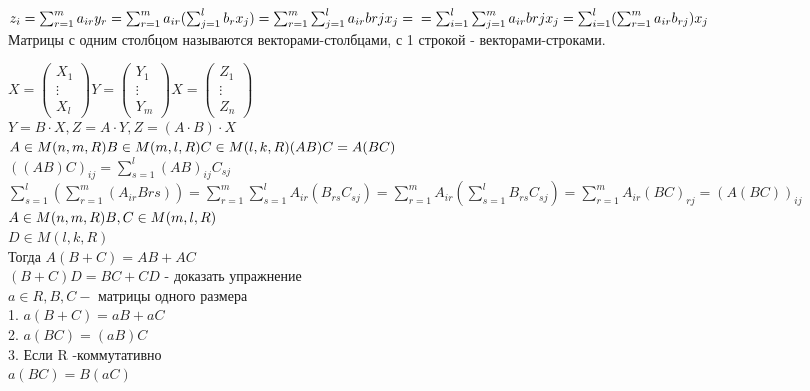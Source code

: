 $ z_i = \sum_{r=1}^m a_{ir} y_r = \sum_{r=1}^{m} a_{ir}(\sum_{j=1}^{l} b_r x_j )  = \sum_{r=1}^{m} \sum_{j=1}^{l} a_{ir}b{rj}x_j =\\=  \sum_{i=1}^{l} \sum_{j=1}^{m} a_{ir}b{rj}x_j = \sum_{i=1}^{l}  (\sum_{r=1}^{m}a_{ir}b_{rj})x_j $ \\
Матрицы с одним столбцом называются векторами-столбцами, с 1 строкой - векторами-строками.
 
$ X =\begin{pmatrix}
X_1 \\
\vdots \\
X_l
\end{pmatrix}  Y=\begin{pmatrix}
Y_1 \\
\vdots \\
Y_m
\end{pmatrix}X =\begin{pmatrix}
Z_1 \\
\vdots \\
Z_n
\end{pmatrix}$\\
$ Y = B \cdot X, Z = A \cdot Y, Z = (A\cdot B) \cdot X $\\
$ A \in M(n,m,R)\\
B \in M(m,l,R)\\
C \in M(l,k,R)\\
(AB)C = A(BC) $\\
$ ((AB)C)_{ij} = \sum_{s=1}^{l} (AB)_{ij} C_{sj} $\\
$ \sum_{s=1}^{l} (\sum_{r=1}^{m} (A_{ir} B{rs} )) = \sum_{r=1}^{m} \sum_{s=1}^{l} A_{ir} (B_{rs} C_{sj}) = \sum_{r=1}^{m} A_{ir} (\sum_{s=1}^{l} B_{rs} C_{sj}) = \sum_{r=1}^{m} A_{ir} (BC)_{rj}  = (A(BC))_{ij}$\\
$ A \in M(n,m,R)\\
B,C \in M(m,l,R)$\\
$ D \in M(l,k,R) $ \\
Тогда $ A(B+C) = AB+AC$\\
$ (B+C)D = BC+CD $ - доказать упражнение \\

$ a\in R, B,C  - $ матрицы одного размера \\
1. $ a(B+C) = aB + aC $\\
2. $ a(BC) = (aB)C $\\
3. Если R -коммутативно \\
$ a(BC) = B(aC) $\\

